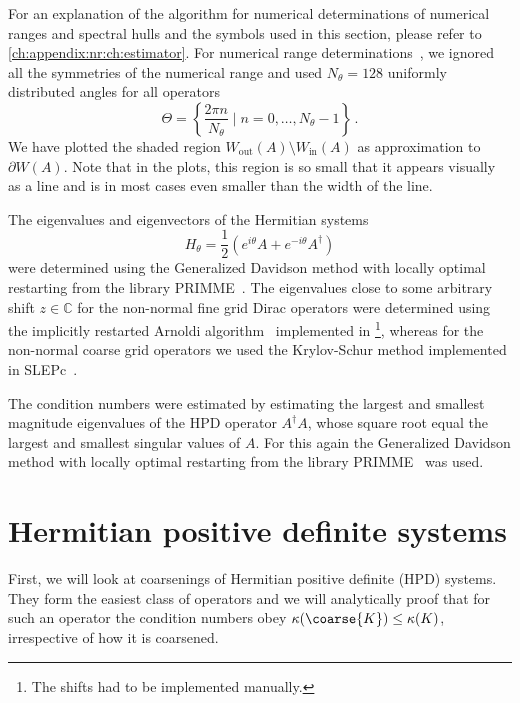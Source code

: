For an explanation of the algorithm for numerical determinations of numerical ranges and spectral hulls and the symbols used in this section, please refer to \cref{ch:appendix:nr:ch:estimator}.
For numerical range determinations~\cite{johnson1978numerical}, we ignored all the symmetries of the numerical range and used $N_{\theta}=128$ uniformly distributed angles for all operators
\begin{equation}
\Theta = \left\{ \frac{2 \pi n}{N_{\theta}} \mid n = 0, \ldots, N_{\theta}-1 \right\} \,.
\end{equation}
We have plotted the shaded region $W_{\text{out}}(A) \setminus W_{\text{in}}(A)$ as approximation to $\partial W(A)$.
Note that in the plots, this region is so small that it appears visually as a line and is in most cases even smaller than the width of the line.

The eigenvalues and eigenvectors of the Hermitian systems
\begin{equation}
H_{\theta} = \frac{1}{2} \left(e^{i \theta} A + e^{-i \theta} A^{\dagger} \right)
\end{equation}
were determined using the Generalized Davidson method with locally optimal restarting from the library PRIMME~\cite{primme}.
The eigenvalues close to some arbitrary shift $z \in \mathbb{C}$ for the non-normal fine grid Dirac operators were determined using the implicitly restarted Arnoldi algorithm~\cite{doi:10.1137/S0895479899358595} implemented in \quda\footnote{The shifts had to be implemented manually.}, whereas for the non-normal coarse grid operators we used the Krylov-Schur method implemented in SLEPc~\cite{slepc}.

The condition numbers were estimated by estimating the largest and smallest magnitude eigenvalues of the HPD operator $A^{\dagger} A$, whose square root equal the largest and smallest singular values of $A$.
For this again the Generalized Davidson method with locally optimal restarting from the library PRIMME~\cite{primme} was used.


\section{Hermitian positive definite systems}

First, we will look at coarsenings of Hermitian positive definite (HPD) systems.
They form the easiest class of operators and we will analytically proof that for such an operator the condition numbers obey $\kappa(\coarse{K}) \leq \kappa(K)$, irrespective of how it is coarsened.

